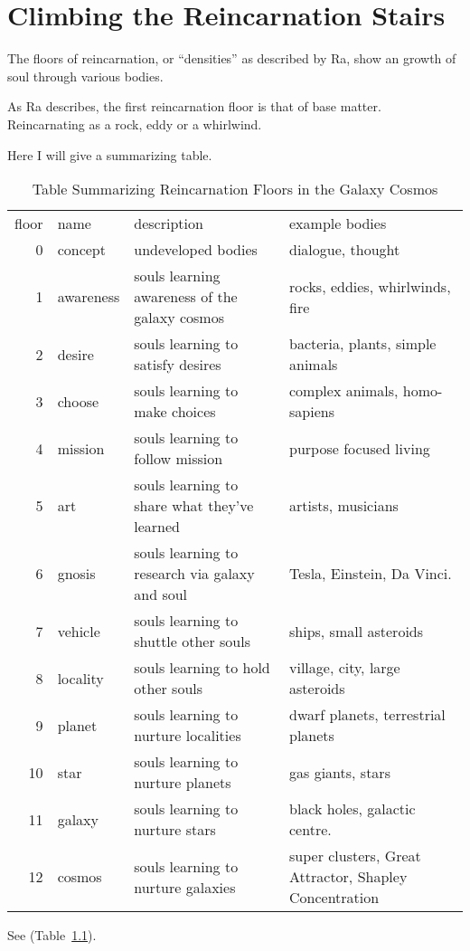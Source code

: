 \chapter{Climbing the Reincarnation Stairs}
\label{chapter:climbing}
The floors of reincarnation, or ``densities'' as described by Ra, show an growth
of soul through various bodies. 


As Ra describes, the first reincarnation floor is that of base matter.
Reincarnating as a rock, eddy or a whirlwind. 

Here I will give a summarizing table.
\begin{table}
\begin{tabular}{r l l l}
  floor & name & description & example bodies \\
  0     & concept & undeveloped bodies & dialogue, thought \\
  1     & awareness & souls learning awareness of the galaxy cosmos & rocks, eddies, whirlwinds, fire \\
  2     & desire & souls learning to satisfy desires & bacteria, plants, simple animals \\
  3     & choose & souls learning to make choices & complex animals, homo-sapiens \\
  4     & mission & souls learning to follow mission & purpose focused living \\
  5     & art & souls learning to share what they've learned & artists,
musicians \\
  6     & gnosis & souls learning to research via galaxy and soul & Tesla, Einstein,
Da Vinci.  \\
  7     & vehicle & souls learning to shuttle other souls & ships, small asteroids \\
  8     & locality & souls learning to hold other souls & village, city, large
asteroids \\
  9     & planet & souls learning to nurture localities & dwarf planets,
terrestrial planets \\
 10     & star & souls learning to nurture planets & gas giants, stars \\
 11     & galaxy & souls learning to nurture  stars & black
holes, galactic centre. \\
 12     & cosmos & souls learning to nurture galaxies & super clusters, Great
Attractor, Shapley Concentration \\
\end{tabular}
\caption{Table Summarizing Reincarnation Floors in the Galaxy Cosmos}
\label{table:reincarnationFloors}
\end{table}
See (Table~\ref{table:reincarnationFloors}).

